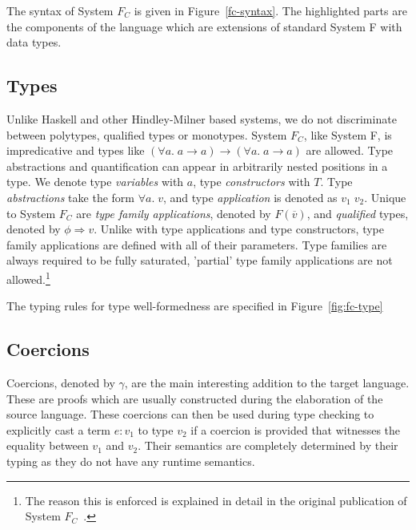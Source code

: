 The syntax of System $F_C$ is given in Figure~\ref{fc-syntax}.
The highlighted parts are the components of the language which are extensions of
standard System F with data types.

\subsection{Types}

Unlike Haskell and other Hindley-Milner based systems, we do not discriminate
between polytypes, qualified types or monotypes. System $F_C$, like System F, is
impredicative and types like $(\forall a. \; a \rightarrow a) \rightarrow
(\forall a. \; a \rightarrow a)$ are allowed. Type abstractions and
quantification can appear in arbitrarily nested positions in a type. We denote type \textit{variables}
with $a$, type \textit{constructors} with $T$. Type \textit{abstractions} take the form
$\forall a. \; v$, and type \textit{application} is denoted as $v_1 \; v_2$. Unique to System $F_C$
are \textit{type family applications}, denoted by $F(\overline{v})$, and
\textit{qualified} types, denoted by $\phi \Rightarrow v$. Unlike with type
applications and type constructors, type family applications are defined with
all of their parameters. Type families are always required to be fully
saturated, 'partial' type family applications are not allowed.\footnote{The
reason this is enforced is explained in detail in the original
publication of System $F_C$~\cite{Sulzmann:2007:SFT:1190315.1190324}.}

The typing rules for type well-formedness are specified in
Figure~\ref{fig:fc-type}

\subsection{Coercions}

Coercions, denoted by $\gamma$, are the main interesting addition to the target
language. These are proofs which are usually constructed during the elaboration
of the source language. These coercions can then be used during type checking to
explicitly cast a term $e : v_1$ to type $v_2$ if a coercion is provided that
witnesses the equality between $v_1$ and $v_2$. Their semantics are completely
determined by their typing as they do not have any runtime semantics.

